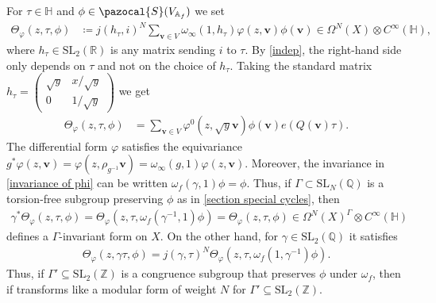 \documentclass[twoside,a4paper,10pt]{article} %
\newcommand{\8}{\infty}
\newcommand{\Z}{\mathbb{Z}}
\newcommand{\vbf}{\mathbf{v}}
\newcommand{\SL}{\mathrm{SL}}
\newcommand{\HH}{\mathbb{H}}
\newcommand{\R}{\mathbb{R}}
\newcommand{\A}{\mathbb{A}}
\newcommand{\Q}{\mathbb{Q}}
\newcommand{\Scal}{\pazocal{S}}
\theoremstyle{mytheoremstyle}
\theoremstyle{remark}
\numberwithin{equation}{section}
\begin{document}
 For $\tau \in \HH$ and $\phi \in \Scal(V_{\A_f})$ we set
\begin{align}
\Theta_{\varphi}(z,\tau,\phi) & \coloneqq j(h_\tau,i)^{N} \sum_{\vbf \in V} \omega_\8(1,h_\tau)\varphi(z,\vbf)\phi(\vbf) \in \Omega^N(X) \otimes C^\8(\HH),
\end{align}
where $h_\tau \in \SL_2(\R)$ is any matrix sending $i$ to $\tau$. By \eqref{indep}, the right-hand side only depends on $\tau$ and not on the choice of $h_\tau$. Taking the standard matrix
$h_\tau=\begin{pmatrix}
\sqrt{y} & x/\sqrt{y} \\ 0 & 1/\sqrt{y}
\end{pmatrix}$ we get
\begin{align}
\Theta_{\varphi}(z,\tau,\phi) & = \sum_{\vbf \in V} \varphi^0(z,\sqrt{y}\vbf) \phi(\vbf) e(Q(\vbf)\tau).
\end{align}
The differential form $\varphi$ satisfies the equivariance $g^\ast \varphi(z,\vbf)=\varphi(z,\rho_{g^{-1}}\vbf)=\omega_\8(g,1)\varphi(z,\vbf)$. Moreover, the invariance in \eqref{invariance of phi} can be written $\omega_f(\gamma,1)\phi=\phi$. Thus, if $\Gamma \subset \SL_N(\Q)$ is a torsion-free subgroup preserving $\phi$ as in \ref{section special cycles}, then
\begin{align}
\gamma^\ast \Theta_{\varphi}(z, \tau,\phi)=\Theta_{\varphi}(z,\tau,\omega_f(\gamma^{-1},1) \phi)=\Theta_{\varphi}(z,\tau, \phi) \in \Omega^{N}(X)^{\Gamma} \otimes C^\8(\HH)
\end{align}
defines a $\Gamma$-invariant form on $X$. On the other hand, for $\gamma \in \SL_2(\Q)$ it satisfies
\begin{align} \label{slash Epsi}
\Theta_{\varphi}(z,\gamma \tau,\phi)=j(\gamma,\tau)^N \Theta_{\varphi}(z,\tau,\omega_f(1,\gamma^{-1}) \phi).
\end{align}
Thus, if $\Gamma' \subseteq \SL_2(\Z)$ is a congruence subgroup that preserves $\phi$ under $\omega_f$, then if transforms like a modular form of weight $N$ for $\Gamma' \subseteq \SL_2(\Z)$. 
\end{document}
